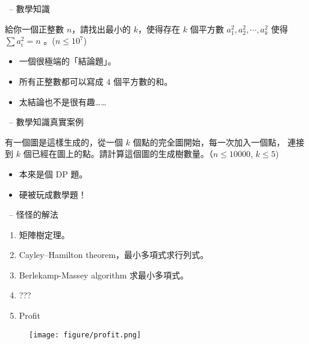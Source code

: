 \documentclass[standalone]{beamer}
\begin{document}
\begin{frame}{\secname \ -- 數學知識}
  \begin{problem}
    給你一個正整數 $n$，請找出最小的 $k$，使得存在 $k$ 個平方數 $a_1^2, a_2^2, \cdots, a_k^2$
    使得 $\sum a_i^2 = n$ 。($n \leq 10^7$)
  \end{problem}

  \begin{itemize}
    \item<2-> 一個很極端的「結論題」。
    \item<3-> 所有正整數都可以寫成 $4$ 個平方數的和。
    \item<4-> 太結論也不是很有趣……
  \end{itemize}
\end{frame}

\begin{frame}{\secname \ -- 數學知識真實案例}
  \begin{problem}
    有一個圖是這樣生成的，從一個 $k$ 個點的完全圖開始，每一次加入一個點，
    連接到 $k$ 個已經在圖上的點。請計算這個圖的生成樹數量。（$n \leq 10000$, $k \leq 5$)
  \end{problem}
  \pause

  \begin{itemize}[<+->]
    \item 本來是個 DP 題。
    \item 硬被玩成數學題！
  \end{itemize}
\end{frame}

\begin{frame}{\secname \ -- 怪怪的解法}
  \pause
  \begin{enumerate}[<+->]
    \item 矩陣樹定理。
    \item Cayley–Hamilton theorem，最小多項式求行列式。
    \item Berlekamp-Massey algorithm 求最小多項式。
    \item ???
    \item Profit
  \end{enumerate}
  \pause

  \begin{figure}
    \texttt{[image: figure/profit.png]}
  \end{figure}
\end{frame}
\end{document}
